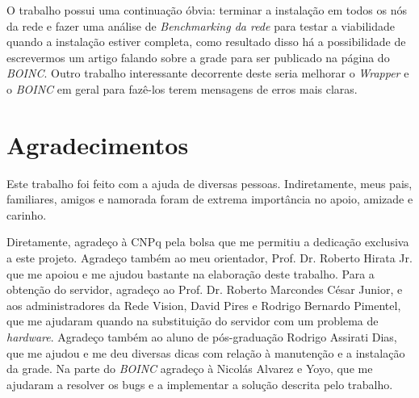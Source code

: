 O trabalho possui uma continuação óbvia: terminar a instalação em todos os nós da rede e fazer uma análise de \emph{Benchmarking da rede} para
testar a viabilidade quando a instalação estiver completa, como resultado disso há a possibilidade de
escrevermos um artigo falando sobre a grade para ser publicado na página do \emph{BOINC}. Outro trabalho interessante decorrente deste 
seria melhorar o \emph{Wrapper} e o \emph{BOINC} em geral para fazê-los terem mensagens de erros mais claras. 

\section{Agradecimentos}

Este trabalho foi feito com a ajuda de diversas pessoas. Indiretamente, meus pais, familiares, amigos e namorada foram de extrema importância 
no apoio, amizade e carinho. 

Diretamente, agradeço à CNPq pela bolsa que me permitiu a dedicação exclusiva a este projeto. Agradeço também ao meu orientador, 
Prof. Dr. Roberto Hirata Jr. que me apoiou e me ajudou bastante na elaboração deste trabalho. Para a obtenção do servidor,
agradeço ao Prof. Dr. Roberto Marcondes César Junior, e aos administradores da Rede Vision, David Pires e Rodrigo Bernardo Pimentel, 
que me ajudaram quando na substituição do servidor com um problema de \emph{hardware}. Agradeço também ao aluno de pós-graduação
Rodrigo Assirati Dias, que me ajudou e me deu diversas dicas com relação à manutenção e a instalação da grade. Na parte do \emph{BOINC}
agradeço à Nicolás Alvarez e Yoyo, que me ajudaram a resolver os bugs e a implementar a solução descrita pelo trabalho.



